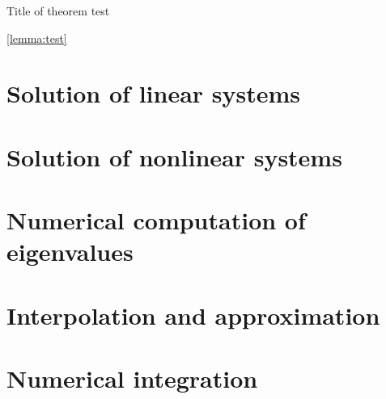 \documentclass[11pt,a4paper]{report}
\begin{document}
\begin{theorem}
    {Title of theorem}
    test
\end{theorem}

\cref{lemma:test}

\chapter{Solution of linear systems}
\label{cha:solution_of_linear_systems}

\chapter{Solution of nonlinear systems}
\label{cha:solution_of_nonlinear_systems}

\chapter{Numerical computation of eigenvalues}%
\label{cha:numerical_computation_of_eigenvalues}

\chapter{Interpolation and approximation}%
\label{cha:interpolation_and_approximation}

\chapter{Numerical integration}
\label{cha:quadrature}

\nocite{*}
\printbibliography
\end{document}
